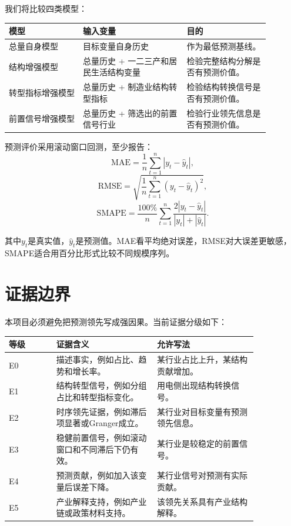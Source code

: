 \documentclass[UTF8,a4paper,11pt]{ctexart}
\begin{document}
我们将比较四类模型：

\begin{longtable}{p{0.25\linewidth}p{0.35\linewidth}p{0.28\linewidth}}
\toprule
模型 & 输入变量 & 目的 \\
\midrule
总量自身模型 & 目标变量自身历史 & 作为最低预测基线。\\
结构增强模型 & 总量历史 + 一二三产和居民生活结构变量 & 检验完整结构分解是否有预测价值。\\
转型指标增强模型 & 总量历史 + 制造业结构转型指标 & 检验结构转换信号是否有预测价值。\\
前置信号增强模型 & 总量历史 + 筛选出的前置信号行业 & 检验行业领先信息是否有预测价值。\\
\bottomrule
\end{longtable}

预测评价采用滚动窗口回测，至少报告：
\[
\mathrm{MAE}
=
\frac{1}{n}\sum_{t=1}^{n}|y_t-\hat{y}_t|,
\]
\[
\mathrm{RMSE}
=
\sqrt{\frac{1}{n}\sum_{t=1}^{n}(y_t-\hat{y}_t)^2},
\]
\[
\mathrm{SMAPE}
=
\frac{100\%}{n}
\sum_{t=1}^{n}
\frac{2|y_t-\hat{y}_t|}{|y_t|+|\hat{y}_t|}.
\]

其中$y_t$是真实值，$\hat{y}_t$是预测值。MAE看平均绝对误差，RMSE对大误差更敏感，SMAPE适合用百分比形式比较不同规模序列。

\section{证据边界}

本项目必须避免把预测领先写成强因果。当前证据分级如下：

\begin{longtable}{p{0.16\linewidth}p{0.34\linewidth}p{0.34\linewidth}}
\toprule
等级 & 证据含义 & 允许写法 \\
\midrule
E0 & 描述事实，例如占比、趋势和增长率。 & 某行业占比上升，某结构贡献增加。\\
E1 & 结构转型信号，例如分组占比和转型指标变化。 & 用电侧出现结构转换信号。\\
E2 & 时序领先证据，例如滞后项显著或Granger成立。 & 某行业对目标变量有预测领先信息。\\
E3 & 稳健前置信号，例如滚动窗口和不同滞后下仍有效。 & 某行业是较稳定的前置信号。\\
E4 & 预测贡献，例如加入该变量后误差下降。 & 某行业信号对预测有实际贡献。\\
E5 & 产业解释支持，例如产业链或政策材料支持。 & 该领先关系具有产业结构解释。\\
\bottomrule
\end{longtable}
\end{document}
